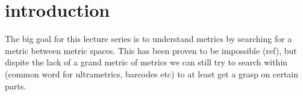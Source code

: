 \section{introduction}
    The big goal for this lecture series is to understand metrics by
    searching for a metric between metric spaces.
    This has been proven to be impossible (ref), but dispite the lack of a
    grand metric of metrics we can still try to search within (common word for
    ultrametrics, barcodes etc) to at least get a grasp on certain parts.
